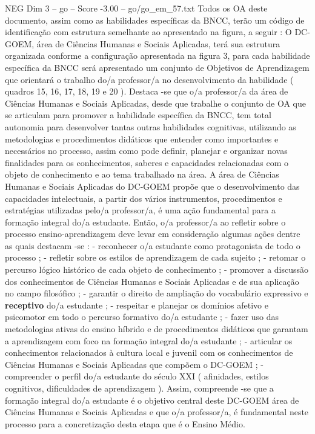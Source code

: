 \begin{textsample}{NEG Dim 3 – go – Score -3.00 – go/go\_em\_57.txt}
Todos os OA deste documento, assim como as habilidades específicas da BNCC, terão um código de identificação com estrutura semelhante ao apresentado na figura, a seguir : O DC-GOEM, área de Ciências Humanas e Sociais Aplicadas, terá sua estrutura organizada conforme a configuração apresentada na figura 3, para cada habilidade específica da BNCC será apresentado um conjunto de Objetivos de Aprendizagem que orientará o trabalho do/a professor/a no desenvolvimento da habilidade ( quadros 15, 16, 17, 18, 19 e 20 ).
Destaca -se que o/a professor/a da área de Ciências Humanas e Sociais Aplicadas, desde que trabalhe o conjunto de OA que se articulam para promover a habilidade específica da BNCC, tem total autonomia para desenvolver tantas outras habilidades cognitivas, utilizando as metodologias e procedimentos didáticos que entender como importantes e necessários no processo, assim como pode definir, planejar e organizar novas finalidades para os conhecimentos, saberes e capacidades relacionadas com o objeto de conhecimento e ao tema trabalhado na área.
A área de Ciências Humanas e Sociais Aplicadas do DC-GOEM propõe que o desenvolvimento das capacidades intelectuais, a partir dos vários instrumentos, procedimentos e estratégias utilizadas pelo/a professor/a, é uma ação fundamental para a formação integral do/a estudante.
Então, o/a professor/a ao refletir sobre o processo ensino-aprendizagem deve levar em consideração algumas ações dentre as quais destacam -se : - reconhecer o/a estudante como protagonista de todo o processo ; - refletir sobre os estilos de aprendizagem de cada sujeito ; - retomar o percurso lógico histórico de cada objeto de conhecimento ; - promover a discussão dos conhecimentos de Ciências Humanas e Sociais Aplicadas e de sua aplicação no campo filosófico ; - garantir o direito de ampliação do vocabulário expressivo e \textbf{receptivo} do/a estudante ; - respeitar e planejar os domínios afetivo e psicomotor em todo o percurso formativo do/a estudante ; - fazer uso das metodologias ativas do ensino híbrido e de procedimentos didáticos que garantam a aprendizagem com foco na formação integral do/a estudante ; - articular os conhecimentos relacionados à cultura local e juvenil com os conhecimentos de Ciências Humanas e Sociais Aplicadas que compõem o DC-GOEM ; - compreender o perfil do/a estudante do século XXI ( afinidades, estilos cognitivos, dificuldades de aprendizagem ).
Assim, compreende -se que a formação integral do/a estudante é o objetivo central deste DC-GOEM área de Ciências Humanas e Sociais Aplicadas e que o/a professor/a, é fundamental neste processo para a concretização desta etapa que é o Ensino Médio.

\end{textsample}
